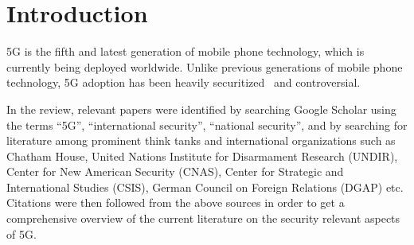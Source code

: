\section{Introduction}

5G is the fifth and latest generation of mobile phone technology, which is
currently being deployed worldwide. Unlike previous generations of mobile phone
technology, 5G adoption has been heavily
securitized~\cite{balzacq2016securitization} and controversial.

In the review, relevant papers were identified by searching Google Scholar using
the terms ``5G'', ``international security'', ``national security'', and by
searching for literature among prominent think tanks and international
organizations such as Chatham House, United Nations Institute for Disarmament
Research (UNDIR), Center for New American Security (CNAS), Center for Strategic
and International Studies (CSIS), German Council on Foreign Relations (DGAP)
etc. Citations were then followed from the above sources in order to get a
comprehensive overview of the current literature on the security relevant
aspects of 5G.

